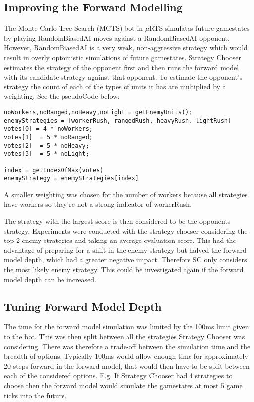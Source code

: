 \documentclass[]{article}
\begin{document}
\subsection{Improving the Forward Modelling}
The Monte Carlo Tree Search (MCTS) bot in $\mu$RTS simulates future gamestates by playing RandomBiasedAI moves against a RandomBiasedAI opponent. However, RandomBiasedAI is a very weak, non-aggressive strategy which would result in overly optomistic simulations of future gamestates. Strategy Chooser estimates the strategy of the opponent first and then runs the forward model with its candidate strategy against that opponent. To estimate the opponent's strategy the count of each of the types of units it has are multiplied by a weighting. See the pseudoCode below:
\begin{lstlisting}
noWorkers,noRanged,noHeavy,noLight = getEnemyUnits();
enemyStrategies = [workerRush, rangedRush, heavyRush, lightRush]
votes[0] = 4 * noWorkers;
votes[1]  = 5 * noRanged;
votes[2]  = 5 * noHeavy;
votes[3]  = 5 * noLight;

index = getIndexOfMax(votes)
enemyStrategy = enemyStrategies[index]
\end{lstlisting}
A smaller weighting was chosen for the number of workers because all strategies have workers so they're not a strong indicator of workerRush. 

The strategy with the largest score is then considered to be the opponents strategy. Experiments were conducted with the strategy chooser considering the top 2 enemy strategies and taking an average evaluation score. This had the advantage of preparing for a shift in the enemy strategy but halved the forward model depth, which had a greater negative impact. Therefore SC only considers the most likely enemy strategy. This could be investigated again if the forward model depth can be increased.

\subsection{Tuning Forward Model Depth}
The time for the forward model simulation was limited by the 100ms limit given to the bot. This was then split between all the strategies Strategy Chooser was considering. There was therefore a trade-off between the simulation time and the breadth of options. Typically 100ms would allow enough time for approximately 20 steps forward in the forward model, that would then have to be split between each of the considered options. E.g. If Strategy Chooser had 4 strategies to choose then the forward model would simulate the gamestates at most 5 game ticks into the future.  
\end{document}
